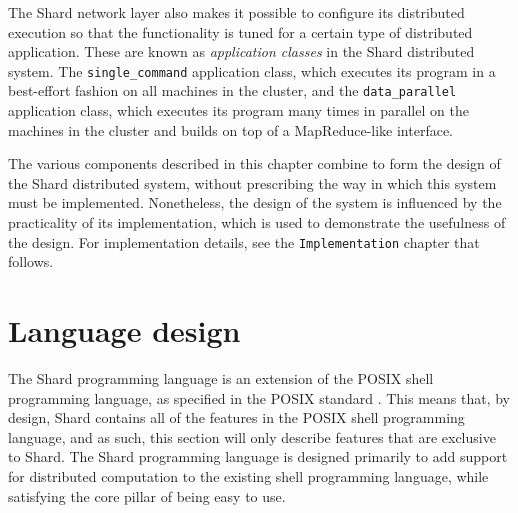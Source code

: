 \documentclass[oneside]{report}
\begin{document}
The Shard network layer also makes it possible to configure its distributed execution so that the functionality is tuned for a certain type of distributed application.
These are known as \textit{application classes} in the Shard distributed system.
The \texttt{single\_command} application class, which executes its program in a best-effort fashion on all machines in the cluster, and the \texttt{data\_parallel} application class, which executes its program many times in parallel on the machines in the cluster and builds on top of a MapReduce-like \cite{dean2004mapreduce} interface.

The various components described in this chapter combine to form the design of the Shard distributed system, without prescribing the way in which this system must be implemented.
Nonetheless, the design of the system is influenced by the practicality of its implementation, which is used to demonstrate the usefulness of the design.
For implementation details, see the \texttt{Implementation} chapter that follows.

\section{Language design}


The Shard programming language is an extension of the POSIX shell programming language, as specified in the POSIX standard \cite{posix2017}.
This means that, by design, Shard contains all of the features in the POSIX shell programming language, and as such, this section will only describe features that are exclusive to Shard.
The Shard programming language is designed primarily to add support for distributed computation to the existing shell programming language, while satisfying the core pillar of being easy to use.
\end{document}
